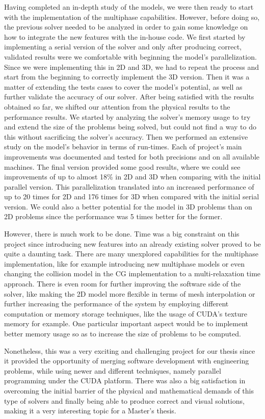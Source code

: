 \documentclass[12pt]{book}
\begin{document}
Having completed an in-depth study of the models, we were then ready to start with the implementation of the multiphase capabilities. However, before doing so, the previous solver needed to be analyzed in order to gain some knowledge on how to integrate the new features with the in-house code. We first started by implementing a serial version of the solver and only after producing correct, validated results were we comfortable with beginning the model's parallelization. Since we were implementing this in 2D and 3D, we had to repeat the process and start from the beginning to correctly implement the 3D version. Then it was a matter of extending the tests cases to cover the model's potential, as well as further validate the accuracy of our solver. After being satisfied with the results obtained so far, we shifted our attention from the physical results to the performance results. We started by analyzing the solver's memory usage to try and extend the size of the problems being solved, but could not find a way to do this without sacrificing the solver's accuracy. Then we performed an extensive study on the model's behavior in terms of run-times. Each of project's main improvements was documented and tested for both precisions and on all available machines. The final version provided some good results, where we could see improvements of up to almost 18\% in 2D and 3D when comparing with the initial parallel version. This parallelization translated into an increased performance of up to 20 times for 2D and 176 times for 3D when compared with the initial serial version. We could also a better potential for the model in 3D problems than on 2D problems since the performance was 5 times better for the former.\par
However, there is much work to be done. Time was a big constraint on this project since introducing new features into an already existing solver proved to be quite a daunting task. There are many unexplored capabilities for the multiphase implementation, like for example introducing new multiphase models or even changing the collision model in the CG implementation to a multi-relaxation time approach. There is even room for further improving the software side of the solver, like making the 2D model more flexible in terms of mesh interpolation or further increasing the performance of the system by employing different computation or memory storage techniques, like the usage of CUDA's texture memory for example. One particular important aspect would be to implement better memory usage so as to increase the size of problems to be computed. \par
Nonetheless, this was a very exciting and challenging project for our thesis since it provided the opportunity of merging software development with engineering problems, while using newer and different techniques, namely parallel programming under the CUDA platform. There was also a big satisfaction in overcoming the initial barrier of the physical and mathematical demands of this type of solvers and finally being able to produce correct and visual solutions, making it a very interesting topic for a Master's thesis.          
\end{document}
